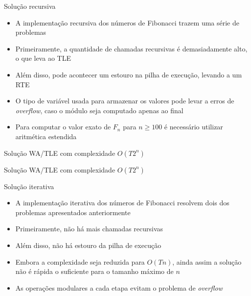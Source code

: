 \begin{frame}[fragile]{Solução recursiva}

    \begin{itemize}
        \item A implementação recursiva dos números de Fibonacci trazem uma série de problemas

        \item Primeiramente, a quantidade de chamadas recursivas é demasiadamente alto, o que
            leva ao TLE

        \item Além disso, pode acontecer um estouro na pilha de execução, levando a um RTE

        \item O tipo de variável usada para armazenar os valores pode levar a erros de 
            \textit{overflow}, caso o módulo seja computado apenas ao final

        \item Para computar o valor exato de $F_n$ para $n \geq 100$ é necessário utilizar
            aritmética estendida
   \end{itemize}

\end{frame}

\begin{frame}[fragile]{Solução WA/TLE com complexidade $O(T2^n)$}
\end{frame}

\begin{frame}[fragile]{Solução WA/TLE com complexidade $O(T2^n)$}
\end{frame}

\begin{frame}[fragile]{Solução iterativa}

    \begin{itemize}
        \item A implementação iterativa dos números de Fibonacci resolvem dois dos problemas
            apresentados anteriormente 

        \item Primeiramente, não há mais chamadas recursivas

        \item Além disso, não há estouro da pilha de execução

        \item Embora a complexidade seja reduzida para $O(Tn)$, ainda assim a solução não é
            rápida o suficiente para o tamanho máximo de $n$

        \item As operações modulares a cada etapa evitam o problema de \textit{overflow}
    \end{itemize}

\end{frame}

